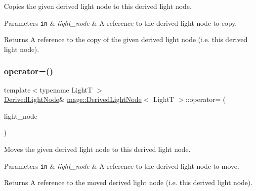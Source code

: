Copies the given derived light node to this derived light node.


\begin{DoxyParams}[1]{Parameters}
\mbox{\tt in}  & {\em light\+\_\+node} & A reference to the derived light node to copy. \\
\hline
\end{DoxyParams}
\begin{DoxyReturn}{Returns}
A reference to the copy of the given derived light node (i.\+e. this derived light node). 
\end{DoxyReturn}
\hypertarget{classmage_1_1_derived_light_node_a7eabbc97578958f97a7ec11728364eec}{}\label{classmage_1_1_derived_light_node_a7eabbc97578958f97a7ec11728364eec} 
\subsubsection{\texorpdfstring{operator=()}{operator=()}\hspace{0.1cm}{\footnotesize\ttfamily [2/2]}}
{\footnotesize\ttfamily template$<$typename LightT $>$ \\
\hyperlink{classmage_1_1_derived_light_node}{Derived\+Light\+Node}\& \hyperlink{classmage_1_1_derived_light_node}{mage\+::\+Derived\+Light\+Node}$<$ LightT $>$\+::operator= (\begin{DoxyParamCaption}\item[{\hyperlink{classmage_1_1_derived_light_node}{Derived\+Light\+Node}$<$ LightT $>$ \&\&}]{light\+\_\+node }\end{DoxyParamCaption})\hspace{0.3cm}{\ttfamily [delete]}}

Moves the given derived light node to this derived light node.


\begin{DoxyParams}[1]{Parameters}
\mbox{\tt in}  & {\em light\+\_\+node} & A reference to the derived light node to move. \\
\hline
\end{DoxyParams}
\begin{DoxyReturn}{Returns}
A reference to the moved derived light node (i.\+e. this derived light node). 
\end{DoxyReturn}
